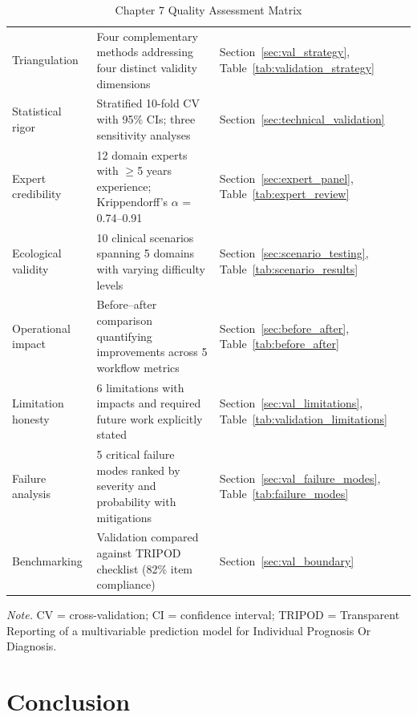 \begin{table}[H]
\small
\tablestripes
\begin{tabularx}{\textwidth}{L L L}
\toprule
{} &  &  \\
\midrule
Triangulation & Four complementary methods addressing four distinct validity dimensions & Section~\ref{sec:val_strategy}, Table~\ref{tab:validation_strategy} \\
\addlinespace
Statistical rigor & Stratified 10-fold CV with 95\% CIs; three sensitivity analyses & Section~\ref{sec:technical_validation} \\
\addlinespace
Expert credibility & 12 domain experts with $\geq$5 years experience; Krippendorff's $\alpha$ = 0.74--0.91 & Section~\ref{sec:expert_panel}, Table~\ref{tab:expert_review} \\
\addlinespace
Ecological validity & 10 clinical scenarios spanning 5 domains with varying difficulty levels & Section~\ref{sec:scenario_testing}, Table~\ref{tab:scenario_results} \\
\addlinespace
Operational impact & Before--after comparison quantifying improvements across 5 workflow metrics & Section~\ref{sec:before_after}, Table~\ref{tab:before_after} \\
\addlinespace
Limitation honesty & 6 limitations with impacts and required future work explicitly stated & Section~\ref{sec:val_limitations}, Table~\ref{tab:validation_limitations} \\
\addlinespace
Failure analysis & 5 critical failure modes ranked by severity and probability with mitigations & Section~\ref{sec:val_failure_modes}, Table~\ref{tab:failure_modes} \\
\addlinespace
Benchmarking & Validation compared against TRIPOD checklist (82\% item compliance) & Section~\ref{sec:val_boundary} \\
\bottomrule
\end{tabularx}
\caption{Chapter 7 Quality Assessment Matrix}
\label{tab:ch7_quality}
\vspace{0.5em}\noindent\textit{Note.} CV = cross-validation; CI = confidence interval; TRIPOD = Transparent Reporting of a multivariable prediction model for Individual Prognosis Or Diagnosis.
\end{table}


\section{Conclusion}
\label{sec:ch7_conclusion}

